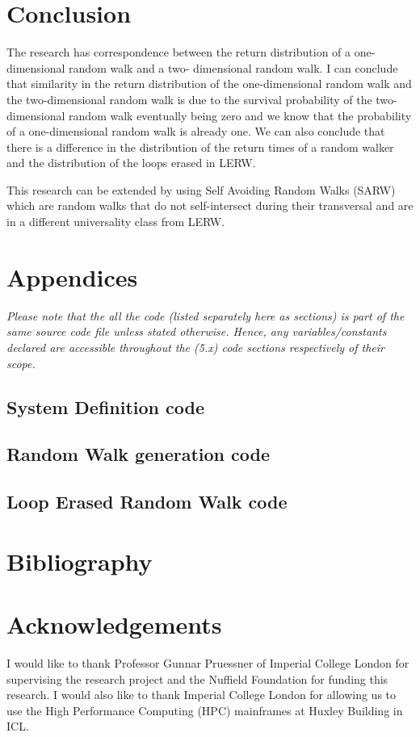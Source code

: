 \documentclass{article}
\begin{document}
\section{Conclusion}
The research has correspondence between the return distribution of a one-dimensional random walk and a two- dimensional random walk. I can conclude that similarity in the return distribution of the one-dimensional random walk and the two-dimensional random walk is due to the survival probability of the two-dimensional random walk eventually being zero and we know that the probability of a one-dimensional random walk is already one. We can also conclude that there is a difference in the distribution of the return times of a random walker and the distribution of the loops erased in LERW. \newline

This research can be extended by using Self Avoiding Random Walks (SARW) which are random walks that do not self-intersect during their transversal and are in a different universality class from LERW.


\section{Appendices}
	\emph{Please note that the all the code (listed separately here as sections) is part of the same source code file unless stated otherwise. Hence, any variables/constants declared are accessible throughout the (5.x) code sections respectively of their scope.}
	\subsection{System Definition code} \label{sssec:sysdef}
	
	\subsection{Random Walk generation code} \label{sssec:srwgen}
	
	\subsection{Loop Erased Random Walk code} \label{sssec:lerw}
	


\section{Bibliography}	
	
	
	

\section{Acknowledgements}
I would like to thank Professor Gunnar Pruessner of Imperial College London for supervising the research project and the Nuffield Foundation for funding this research. I would also like to thank Imperial College London for allowing us to use the High Performance Computing (HPC) mainframes at Huxley Building in ICL.
\end{document}
